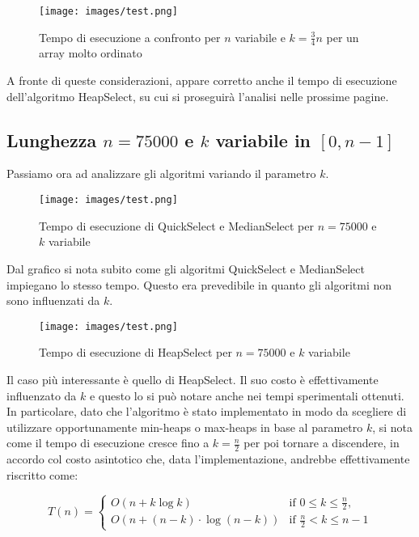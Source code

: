 \documentclass{article}
\begin{document}
	\begin{figure}[h!]
  		\texttt{[image: images/test.png]}
  		\caption{Tempo di esecuzione a confronto per $n$ variabile e $k=\frac{3}{4}	n$ per un array molto ordinato}
  		\label{fig:graph2}
	\end{figure}
	
	A fronte di queste considerazioni, appare corretto anche il tempo di esecuzione dell'algoritmo HeapSelect, su cui si proseguirà l'analisi nelle prossime pagine. 
		
	\newpage
	
	\subsection{Lunghezza $n=75000$ e $k$ variabile in $[0,n-1]$}
	Passiamo ora ad analizzare gli algoritmi variando il parametro $k$.
	
	\begin{figure}[h!]
  		\texttt{[image: images/test.png]}
  		\caption{Tempo di esecuzione di QuickSelect e MedianSelect per $n=75000$ e $k$ variabile}
  		\label{fig:graph3}
	\end{figure}
	
	Dal grafico si nota subito come gli algoritmi QuickSelect e MedianSelect impiegano lo stesso tempo. Questo era prevedibile in quanto gli algoritmi non sono influenzati da $k$.
	
	\begin{figure}[h!]
  		\texttt{[image: images/test.png]}
  		\caption{Tempo di esecuzione di HeapSelect per $n=75000$ e $k$ variabile}
  		\label{fig:graph3}
	\end{figure}
	
Il caso più interessante è quello di HeapSelect. Il suo costo è effettivamente influenzato da $k$ e questo lo si può notare anche nei tempi sperimentali ottenuti. In particolare, dato che l'algoritmo è stato implementato in modo da scegliere di utilizzare opportunamente min-heaps o max-heaps in base al parametro $k$, si nota come il tempo di esecuzione cresce fino a $k=\frac{n}{2}$ per poi tornare a discendere, in accordo col costo asintotico che, data l'implementazione, andrebbe effettivamente riscritto come:
	
	\[
		T\left(n\right) =
			\begin{cases}
				O\left(n + k\log{k}\right)  & \text{if $0\leq k \leq \frac{n}{2}$,} \\
				O\left(n + \left(n-k\right)\cdot\log{\left(n-k\right)}\right) & \text{if $\frac{n}{2} < k \leq n-1$} 
			\end{cases}
	\]
	
\end{document}
